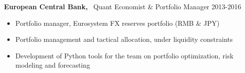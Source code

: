 \documentclass[usegeometry, 10pt, a4paper]{cv} %
\newcommand{\activite}[1]{\textbf{#1}\ }
\begin{document}
\vspace{0.5cm}

\activite{European Central Bank,} Quant Economist \& Portfolio Manager \hfill 2013-2016 \\ \vspace{-0.5cm}

\begin{itemize}[label={}, rightmargin=\dimexpr\linewidth-13cm-\leftmargin\relax]
\item Portfolio manager, Eurosystem FX reserves portfolio (RMB \& JPY)
\item Portfolio management and tactical allocation, under liquidity constraints
\item Development of Python tools for the team on portfolio optimization, risk modeling and forecasting  
\end{itemize}
\end{document}
